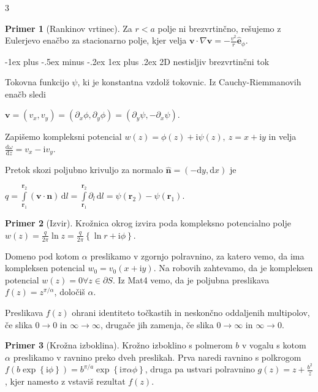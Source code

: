 \documentclass[10pt,landscape]{article}
\makeatletter
\renewcommand{\subsubsection}{\@startsection{subsubsection}{3}{0mm}%
	{-1ex plus -.5ex minus -.2ex}%
	{1ex plus .2ex}%
	{\normalfont\small\bfseries}}
\theoremstyle{definition}
\newtheorem*{primer}{Primer}
\makeatother
\begin{document}
\begin{multicols}{3}
\begin{primer}[Rankinov vrtinec]
    Za \( r < a \) polje ni brezvrtinčno, rešujemo z Eulerjevo enačbo za stacionarno polje, kjer velja \( \mathbf{v} \cdot \nabla \mathbf{v} = - \frac{v ^2}{r} \hat{\mathbf{e}}_{\phi} \).
  \end{primer}

  \subsubsection{2D nestisljiv brezvrtinčni tok}

  Tokovna funkcijo \( \psi \), ki je konstantna vzdolž tokovnic. Iz Cauchy-Riemmanovih enačb sledi

  \( \mathbf{v} = (v_x, v_y ) = \left( \partial_x \phi, \partial_y \phi \right) = \left( \partial_y \psi, - \partial_x \psi \right) \).

  Zapišemo kompleksni potencial \( w(z) = \phi(z) + \mathrm{i} \psi(z), \ z = x + \mathrm{i} y \) in velja \( \frac{\mathrm{d} \omega}{\mathrm{d} z} = v_x - \mathrm{i} v_y \).

  Pretok skozi poljubno krivuljo za normalo \( \hat{\mathbf{n}} = (- \mathrm{d} y, \mathrm{d} x) \) je

  \( q = \int\limits_{\mathbf{r}_1}^{\mathbf{r}_2} \left( \mathbf{v} \cdot \mathbf{n} \right) \, \mathrm{d} l = \int\limits_{\mathbf{r}_1}^{\mathbf{r}_2} \partial_l \, \mathrm{d} l = \psi(\mathbf{r}_2) - \psi(\mathbf{r}_1) \).
  
  \begin{primer}[Izvir]
    Krožnica okrog izvira poda kompleksno potencialno polje \( w(z) = \frac{q}{2 \pi} \ln z = \frac{q}{2 \pi} \left\{ \ln r + \mathrm{i} \phi \right\} \).
  \end{primer}

  Domeno pod kotom \( \alpha \) preslikamo v zgornjo polravnino, za katero vemo, da ima kompleksen potencial \( w_0 = v_0 (x + \mathrm{i} y) \). Na robovih zahtevamo, da je kompleksen potencial \( w(z) = 0 \forall z \in \partial S \). Iz Mat4 vemo, da je poljubna preslikava \( f(z) = z^{\pi / \alpha} \), določiš \( \alpha \).

  Preslikava \( f(z) \) ohrani identiteto točkastih in neskončno oddaljenih multipolov, če slika \( 0 \to 0 \) in \( \infty \to \infty \), drugače jih zamenja, če slika \( 0 \to \infty \) in \( \infty \to 0 \). 

  \begin{primer}[Krožna izboklina]
   Krožno izboklino s polmerom \( b \) v vogalu s kotom \( \alpha \) preslikamo v ravnino preko dveh preslikah. Prva naredi ravnino s polkrogom \( f(b \exp \left\{ \mathrm{i} \phi \right\}) = b^{\pi / a} \exp \left\{ \mathrm{i} \pi \alpha \phi \right\} \), druga pa ustvari polravnino \( g(z) = z + \frac{b ^2}{z} \), kjer namesto z vstaviš rezultat \( f(z) \). 
  \end{primer}
  

\end{multicols}
\end{document}
